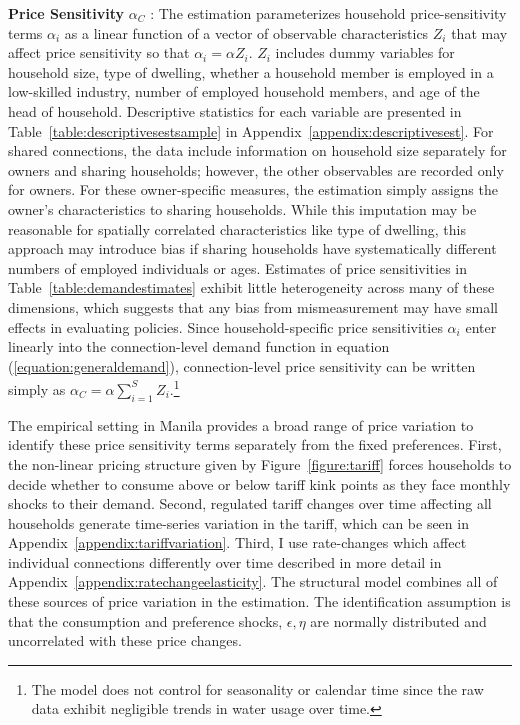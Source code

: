 \documentclass[12pt]{article}
\begin{document}
\textbf{Price Sensitivity} $\alpha_C$  :  The estimation parameterizes household price-sensitivity terms $\alpha_i$ as a linear function of a vector of observable characteristics $Z_i$ that may affect price sensitivity so that $\alpha_i = \alpha Z_i$.  $Z_i$ includes dummy variables for household size, type of dwelling, whether a household member is employed in a low-skilled industry, number of employed household members, and age of the head of household.  Descriptive statistics for each variable are presented in Table~\ref{table:descriptivesestsample} in Appendix~\ref{appendix:descriptivesest}.  For shared connections, the data include information on household size separately for owners and sharing households; however, the other observables are recorded only for owners.  For these owner-specific measures, the estimation simply assigns the owner's characteristics to sharing households.  While this imputation may be reasonable for spatially correlated characteristics like type of dwelling, this approach may introduce bias if sharing households have systematically different numbers of employed individuals or ages.  Estimates of price sensitivities in Table~\ref{table:demandestimates} exhibit little heterogeneity across many of these dimensions, which suggests that any bias from mismeasurement may have small effects in evaluating policies.  Since household-specific price sensitivities $\alpha_i$ enter linearly into the connection-level demand function in equation (\ref{equation:generaldemand}), connection-level price sensitivity can be written simply as $\alpha_C = \alpha \sum_{i=1}^{S} Z_i$.\footnote{The model does not control for seasonality or calendar time since the raw data exhibit negligible trends in water usage over time.}

The empirical setting in Manila provides a broad range of price variation to identify these price sensitivity terms separately from the fixed preferences.  First, the non-linear pricing structure given by Figure~\ref{figure:tariff} forces households to decide whether to consume above or below tariff kink points as they face monthly shocks to their demand.  Second, regulated tariff changes over time affecting all households generate time-series variation in the tariff, which can be seen in Appendix~\ref{appendix:tariffvariation}.  Third, I use rate-changes which affect individual connections differently over time described in more detail in Appendix~\ref{appendix:ratechangeelasticity}.  The structural model combines all of these sources of price variation in the estimation.  The identification assumption is that the consumption and preference shocks, $\epsilon,\eta$ are normally distributed and uncorrelated with these price changes.
\end{document}
